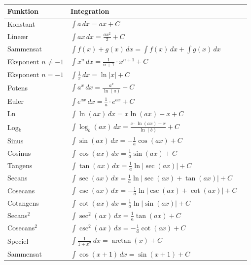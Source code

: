 
\begin{table}[H]
\centering
\begingroup
\small
\renewcommand{\arraystretch}{1.6}
\begin{tabular}{@{}>{\raggedright}p{4.65cm}ll@{}}
\toprule
\textbf{Funktion} & \textbf{Integration} \\
\midrule
Konstant & $\int a \, dx = ax + C$ \\
Lineær & $\int ax \, dx = \frac{a x^2}{2} + C$ \\
Sammensat & $\int f(x) + g(x) \, dx = \int f(x) \, dx + \int g(x) \, dx$ \\
\midrule
Eksponent $n \neq -1$ & $\int x^n \, dx = \frac{1}{n+1} \cdot x^{n+1} + C$ \\
Eksponent $n = -1$ & $\int \frac{1}{x} \, dx = \ln|x| + C$ \\
\midrule
Potens & $\int a^{x} \, dx = \frac{a^{x}}{\ln(a)} + C$ \\
Euler & $\int e^{ax} \, dx = \frac{1}{a} \cdot e^{ax} + C$ \\
Ln & $\int \ln(ax) \, dx = x \ln(ax) - x + C$ \\
Log$_\text{b}$ & $\int \log_b(ax) \, dx = \frac{x \cdot \ln(ax) - x}{\ln(b)} + C$ \\
\midrule
Sinus & $\int \sin(ax) \, dx = -\frac{1}{a} \cos(ax) + C$ \\
Cosinus & $\int \cos(ax) \, dx = \frac{1}{a} \sin(ax) + C$ \\
Tangens & $\int \tan(ax) \, dx = \frac{1}{a} \ln|\sec(ax)| + C$ \\
Secans & $\int \sec(ax) \, dx = \frac{1}{a} \ln|\sec(ax) + \tan(ax)| + C$ \\
Cosecans & $\int \csc(ax) \, dx = -\frac{1}{a} \ln|\csc(ax) + \cot(ax)| + C$ \\
Cotangens & $\int \cot(ax) \, dx = \frac{1}{a} \ln|\sin(ax)| + C$ \\
\midrule
Secans$^2$ & $\int \sec^2(ax) \, dx = \frac{1}{a} \tan(ax) + C$ \\
Cosecans$^2$ & $\int \csc^2(ax) \, dx = -\frac{1}{a} \cot(ax) + C$ \\
\midrule
Speciel & $\int \frac{1}{1+x^2} \ dx = \arctan(x) + C$ \\
Sammensat & $\int \cos(x+1) \, dx = \sin(x+1) + C$ \\
\bottomrule
\end{tabular}
\endgroup
\end{table}
